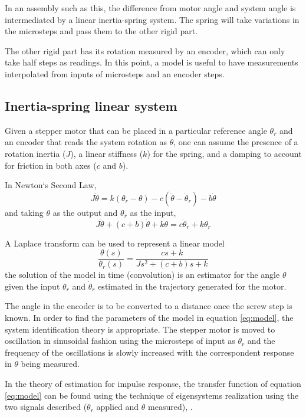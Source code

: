 \documentclass[journal]{IEEEtran}
\begin{document}
In an assembly such as this, the difference from motor angle and system angle is intermediated by a linear inertia-spring system. The spring will take variations in the microsteps and pass them to the other rigid part.

The other rigid part has its rotation measured by an encoder, which can only take half steps as readings. In this point, a model is useful to have measurements interpolated from inputs of microsteps and an encoder steps.

\subsection{Inertia-spring linear system}

Given a stepper motor that can be placed in a particular reference angle $\theta_r$ and an encoder that reads the system rotation as $\theta$, one can assume the presence of a rotation inertia ($J$), a linear stiffness ($k$) for the spring, and a damping to account for friction in both axes ($c$ and $b$). 

In Newton`s Second Law,
\begin{equation}
    J\ddot{\theta} = k(\theta_r-\theta)-c(\dot{\theta}-\dot{\theta}_r)-b\dot{\theta}
\end{equation}
and taking $\theta$ as the output and $\theta_r$ as the input,
\begin{equation}
        J\ddot{\theta} + (c+b)\dot{\theta}+k\theta=c\dot{\theta}_r+k\theta_r
\end{equation}

A Laplace transform can be used to represent a linear model
\begin{equation}
    \frac{\theta(s)}{\theta_r(s)} = \frac{cs+k}{Js^2+(c+b)s+k}
    \label{eq:model}
\end{equation}
the solution of the model in time (convolution) is an estimator for the angle $\theta$ given the input $\theta_r$ and $\dot{\theta}_r$ estimated in the trajectory generated for the motor.


The angle in the encoder is to be converted to a distance once the screw step is known. In order to find the parameters of the model in equation \ref{eq:model}, the system identification theory is appropriate. The stepper motor is moved to oscillation in sinusoidal fashion using the microsteps of input as $\theta_r$ and the frequency of the oscillations is slowly increased with the correspondent response in $\theta$ being measured. 

In the theory of estimation for impulse response, the transfer function of equation \ref{eq:model} can be found using the technique of eigensystems realization using the two signals described ($\theta_r$ applied and $\theta$ measured), \cite{Ljung1999}.
\end{document}
